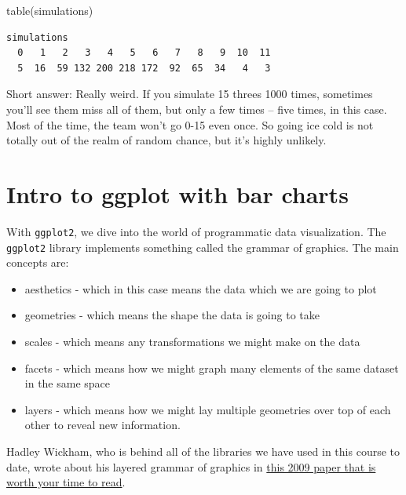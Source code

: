 \documentclass[
  letterpaper,
  DIV=11,
  numbers=noendperiod]{scrreprt}
\newenvironment{Shaded}{\begin{snugshade}}{\end{snugshade}}
\newcommand{\FunctionTok}[1]{\textcolor[rgb]{0.28,0.35,0.67}{#1}}
\newcommand{\NormalTok}[1]{\textcolor[rgb]{0.00,0.23,0.31}{#1}}
\providecommand{\tightlist}{%
  \setlength{\itemsep}{0pt}\setlength{\parskip}{0pt}}\usepackage{longtable,booktabs,array}
\begin{document}
\begin{Shaded}
\begin{Highlighting}[]
\FunctionTok{table}\NormalTok{(simulations)}
\end{Highlighting}
\end{Shaded}

\begin{verbatim}
simulations
  0   1   2   3   4   5   6   7   8   9  10  11 
  5  16  59 132 200 218 172  92  65  34   4   3 
\end{verbatim}

Short answer: Really weird. If you simulate 15 threes 1000 times,
sometimes you'll see them miss all of them, but only a few times -- five
times, in this case. Most of the time, the team won't go 0-15 even once.
So going ice cold is not totally out of the realm of random chance, but
it's highly unlikely.


\hypertarget{intro-to-ggplot-with-bar-charts}{%
\chapter{Intro to ggplot with bar
charts}\label{intro-to-ggplot-with-bar-charts}}

With \texttt{ggplot2}, we dive into the world of programmatic data
visualization. The \texttt{ggplot2} library implements something called
the grammar of graphics. The main concepts are:

\begin{itemize}
\tightlist
\item
  aesthetics - which in this case means the data which we are going to
  plot
\item
  geometries - which means the shape the data is going to take
\item
  scales - which means any transformations we might make on the data
\item
  facets - which means how we might graph many elements of the same
  dataset in the same space
\item
  layers - which means how we might lay multiple geometries over top of
  each other to reveal new information.
\end{itemize}

Hadley Wickham, who is behind all of the libraries we have used in this
course to date, wrote about his layered grammar of graphics in
\href{http://byrneslab.net/classes/biol607/readings/wickham_layered-grammar.pdf}{this
2009 paper that is worth your time to read}.
\end{document}
